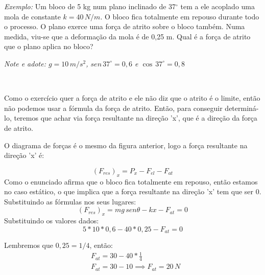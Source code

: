 \documentclass[12pt]{extarticle}
\newcommand{\<}{\langle}
\renewcommand{\>}{\rangle}
\theoremstyle{definition}
\begin{document}
\textit{Exemplo:} Um bloco de 5 kg num plano inclinado de 37$^\circ$ tem a ele acoplado uma mola de constante $k=40\,N/m$. O bloco fica totalmente em repouso durante todo o processo. O plano exerce uma força de atrito sobre o bloco também. Numa medida, viu-se que a deformação da mola é de 0,25 m. Qual é a força de atrito que o plano aplica no bloco?

\textit{Note e adote: $g=10\,m/s^2$, $sen\, 37^\circ =0,6$ e $\cos\,37^\circ = 0,8$}

\

Como o exercício quer a força de atrito e ele não diz que o atrito é o limite, então não podemos usar a fórmula da força de atrito. Então, para conseguir determiná-lo, teremos que achar via força resultante na direção 'x', que é a direção da força de atrito.

O diagrama de forças é o mesmo da figura anterior, logo a força resultante na direção 'x' é:

\begin{equation*}
    (F_{res})_{x} = P_x - F_{el} - F_{at}
\end{equation*}
Como o enunciado afirma que o bloco fica totalmente em repouso, então estamos no caso estático, o que implica que a força resultante na direção 'x' tem que ser 0. Substituindo as fórmulas nos seus lugares:
\begin{equation*}
    (F_{res})_{x} = mg\,sen\theta - kx - F_{at} =0
\end{equation*}
Substituindo os valores dados:
\begin{equation*}
    5*10*0,6 - 40*0,25 - F_{at} =0
\end{equation*}

Lembremos que $0,25 = 1/4$, então:
\begin{align*}
    &F_{at} = 30 - 40*\frac{1}{4}\\
    &F_{at} = 30 -10 \implies \boxed{F_{at} = 20\, N}
\end{align*}
\end{document}
